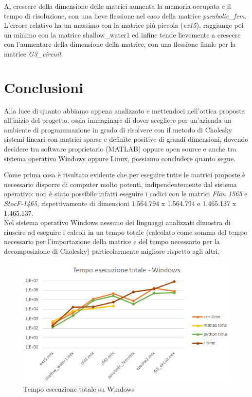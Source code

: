 \documentclass[a4paper,12pt]{article}
\begin{document}
Al crescere della dimensione delle matrici aumenta la memoria occupata e il tempo di risoluzione, con una lieve flessione nel caso della matrice \textit{parabolic\_fem}.
L’errore relativo ha un massimo con la matrice più piccola (\textit{ex15}), raggiunge poi un minimo con la matrice shallow\_water1 ed infine tende lievemente a crescere con l’aumentare della dimensione della matrice, con una flessione finale per la matrice \textit{G3\_circuit}.

\newpage

\fancyhf{}
\fancyfoot[C]{\thepage}

\section{Conclusioni}
Alla luce di quanto abbiamo appena analizzato e mettendoci nell’ottica proposta all’inizio del progetto, ossia immaginare di dover scegliere per un’azienda un ambiente di programmazione in grado di risolvere con il metodo di Cholesky sistemi lineari con matrici sparse e deﬁnite positive di grandi dimensioni, dovendo decidere tra software proprietario (MATLAB) oppure open source e anche tra sistema operativo Windows oppure Linux, possiamo concludere quanto segue.
\bigskip

\noindent Come prima cosa è risultato evidente che per eseguire tutte le matrici proposte è necessario disporre di computer molto potenti, indipendentemente dal sistema operativo: non è stato possibile infatti eseguire i codici con le matrici \textit{Flan 1565} e \textit{StocF-1465}, rispettivamente di dimensioni 1.564.794 x 1.564.794 e 1.465.137 x 1.465.137.\\

\noindent Nel sistema operativo Windows nessuno dei linguaggi analizzati dimostra di riuscire ad eseguire i calcoli in un tempo totale (calcolato come somma del tempo necessario per l'importazione della matrice e del tempo necessario per la decomposizione di Cholesky) particolarmente migliore rispetto agli altri.

\begin{figure}[H]
\centering
  \includegraphics[width=0.7\linewidth]{img/tempototwin.png}
  \caption{Tempo esecuzione totale su Windows}
\end{figure}
\end{document}
